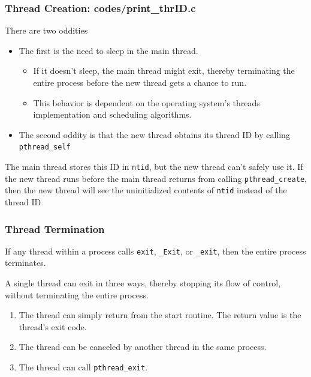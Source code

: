 \documentclass[newPxFont,sthlmFooter,nooffset]{beamer}
\begin{document}
\begin{frame}[t]
  \frametitle{Thread Creation: codes/print\_thrID.c}

There are two oddities
\begin{itemize}
\item The first is the need to sleep in the main thread.
  \begin{itemize}
  \item If it doesn’t sleep, the main thread might exit, thereby
    terminating the entire process before the new thread gets a chance
    to run.
  \item This behavior is dependent on the operating system’s
    threads implementation and scheduling algorithms.
  \end{itemize}
\item The second oddity is that the new thread obtains its thread ID by calling \texttt{pthread\_self}
\end{itemize}

The main thread stores this ID in \texttt{ntid}, but the new thread can’t safely use it. If the new thread runs before the main thread returns from calling \texttt{pthread\_create}, then the new thread will see the uninitialized contents of \texttt{ntid} instead of the thread ID

\end{frame}


\begin{frame}[t]
  \frametitle{Thread Termination}
If any thread within a process calls \texttt{exit}, \texttt{\_Exit}, or \texttt{\_exit}, then the entire process terminates.

 {A single thread can exit in three ways, thereby stopping its flow of control, without terminating the entire process.}
\begin{enumerate}
\item <2-> The thread can simply return from the start routine. The
  return value is the thread’s exit code.
\item <3-> The thread can be
  canceled by another thread in the same process.
\item  <4-> The thread can
  call \texttt{pthread\_exit}.
\end{enumerate}

\end{frame}
\end{document}
